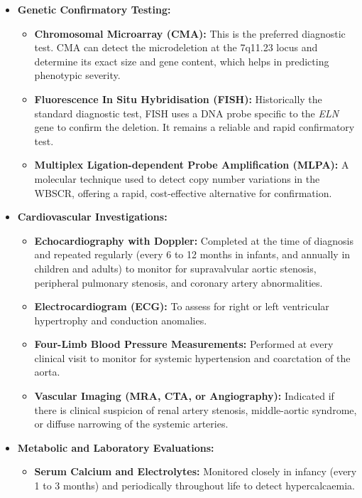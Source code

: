 \begin{itemize}
    \item \textbf{Genetic Confirmatory Testing:}
    \begin{itemize}
        \item \textbf{Chromosomal Microarray (CMA):} This is the preferred diagnostic test. CMA can detect the microdeletion at the 7q11.23 locus and determine its exact size and gene content, which helps in predicting phenotypic severity.
        \item \textbf{Fluorescence In Situ Hybridisation (FISH):} Historically the standard diagnostic test, FISH uses a DNA probe specific to the \textit{ELN} gene to confirm the deletion. It remains a reliable and rapid confirmatory test.
        \item \textbf{Multiplex Ligation-dependent Probe Amplification (MLPA):} A molecular technique used to detect copy number variations in the WBSCR, offering a rapid, cost-effective alternative for confirmation.
    \end{itemize}
    \item \textbf{Cardiovascular Investigations:}
    \begin{itemize}
        \item \textbf{Echocardiography with Doppler:} Completed at the time of diagnosis and repeated regularly (every 6 to 12 months in infants, and annually in children and adults) to monitor for supravalvular aortic stenosis, peripheral pulmonary stenosis, and coronary artery abnormalities.
        \item \textbf{Electrocardiogram (ECG):} To assess for right or left ventricular hypertrophy and conduction anomalies.
        \item \textbf{Four-Limb Blood Pressure Measurements:} Performed at every clinical visit to monitor for systemic hypertension and coarctation of the aorta.
        \item \textbf{Vascular Imaging (MRA, CTA, or Angiography):} Indicated if there is clinical suspicion of renal artery stenosis, middle-aortic syndrome, or diffuse narrowing of the systemic arteries.
    \end{itemize}
    \item \textbf{Metabolic and Laboratory Evaluations:}
    \begin{itemize}
        \item \textbf{Serum Calcium and Electrolytes:} Monitored closely in infancy (every 1 to 3 months) and periodically throughout life to detect hypercalcaemia.

\end{itemize}
\end{itemize}
